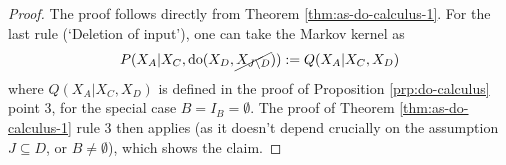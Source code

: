 \begin{proof}
The proof follows directly from Theorem \ref{thm:as-do-calculus-1}.
For the last rule (`Deletion of input'), one can take the Markov kernel as
$$P(X_A|X_C,\operatorname{do}(X_{D},\cancel{X_{J\setminus D}})) := Q(X_A|X_C,X_D)$$
where $Q(X_A|X_C,X_D)$ is defined in the proof of Proposition \ref{prp:do-calculus} point 3, for the special case $B = I_B = \emptyset$.
The proof of Theorem \ref{thm:as-do-calculus-1} rule 3 then applies (as it doesn't depend crucially on the assumption $J \subseteq D$, or $B \ne \emptyset$), which shows the claim.
\end{proof}
